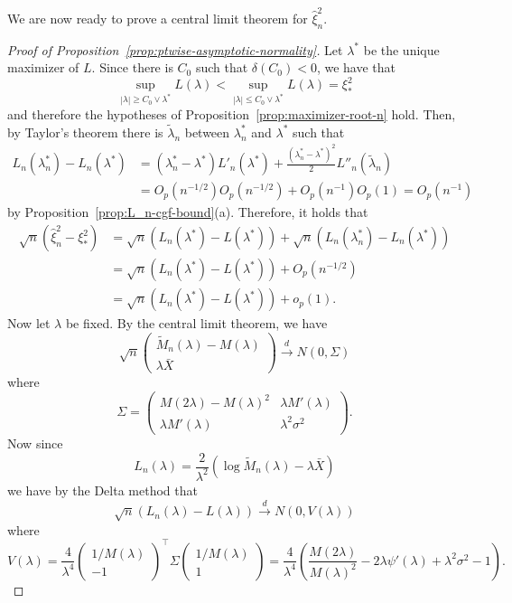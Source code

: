 \documentclass{article}
\theoremstyle{definition}
\newcommand{\1}{\mathbbm{1}}
\begin{document}
We are now ready to prove a central limit theorem for $\hat \xi_n^2$. 
\begin{proof}[Proof of Proposition~\ref{prop:ptwise-asymptotic-normality}]
    Let $\lambda^*$ be the unique maximizer of $L$. Since there is $C_0$ such that $\delta(C_0) < 0$, we have that
    \[
    \sup_{|\lambda|  \geq C_0 \vee \lambda^*} L(\lambda) < \sup_{|\lambda| \leq C_0 \vee \lambda^*} L(\lambda) = \xi_*^2
    \]
    and therefore the hypotheses of Proposition~\ref{prop:maximizer-root-n} hold. 
     Then, by Taylor's theorem there is $\tilde \lambda_n$ between $\lambda_n^*$ and $\lambda^*$ such that 
    \begin{align*}
         L_n(\lambda^*_n) - L_n(\lambda^*) &= (\lambda^*_n - \lambda^*) L'_n(\lambda^*) + \frac{(\lambda_n^* - \lambda^*)^2}{2}L''_n(\tilde \lambda_n) \\
         &= O_p(n^{-1/2})O_p(n^{-1/2}) + O_p(n^{-1})O_p(1) = O_p(n^{-1})
    \end{align*}
    by Proposition~\ref{prop:L_n-cgf-bound}(a). 
    Therefore, it holds that 
    \begin{align*}
        \sqrt n(\hat \xi_n^2 - \xi_*^2) &= \sqrt n(L_n(\lambda^*) - L(\lambda^*))  + \sqrt n(L_n(\lambda^*_n) - L_n(\lambda^*)) \\ &=  \sqrt n(L_n(\lambda^*) - L(\lambda^*)) + O_p(n^{-1/2}) \\
        &= \sqrt n(L_n(\lambda^*) - L(\lambda^*)) + o_p(1).
    \end{align*}
    Now let $\lambda$ be fixed. By the central limit theorem, we have 
    \[
    \sqrt n\begin{pmatrix}
        \tilde M_n(\lambda) - M(\lambda) \\ \lambda\bar X
    \end{pmatrix} \xrightarrow{d} N\left(0, \Sigma\right)
    \]
    where 
    \[
    \Sigma = \begin{pmatrix}
        M(2\lambda) - M(\lambda)^2 & \lambda M'(\lambda) \\ \lambda M'(\lambda) & \lambda^2\sigma^2
    \end{pmatrix}.
    \]
    Now since 
    \[
    L_n(\lambda) = \frac{2}{\lambda^2}\left(\log \tilde M_n(\lambda) - \lambda\bar X\right)
    \]
    we have by the Delta method that 
    \[
    \sqrt n (L_n(\lambda) - L(\lambda)) \xrightarrow{d} N(0, V(\lambda))
    \]
    where 
    \[
    V(\lambda) = \frac{4}{\lambda^4}\begin{pmatrix}
        1/M(\lambda) \\ -1
    \end{pmatrix}^\top \Sigma \begin{pmatrix}
        1/M(\lambda) \\ 1
    \end{pmatrix} = \frac{4}{\lambda^4} \left(\frac{M(2\lambda)}{M(\lambda)^2} - 2\lambda \psi'(\lambda)+  \lambda^2\sigma^2 - 1\right).
    \]
\end{proof}
\end{document}
